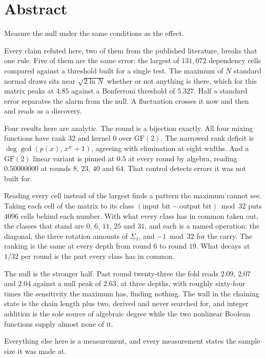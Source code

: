 \chapter*{Abstract}

Measure the null under the same conditions as the effect.

Every claim refuted here, two of them from the published literature, breaks that one rule.
Five of them are the same error: the largest of $131{,}072$ dependency cells compared against a
threshold built for a single test. The maximum of $N$ standard normal draws sits near
$\sqrt{2 \ln N}$ whether or not anything is there, which for this matrix peaks at $4.85$ against a
Bonferroni threshold of $5.327$. Half a standard error separates the alarm from the null.
A fluctuation crosses it now and then and reads as a discovery.

Four results here are analytic. The round is a bijection exactly. All four
mixing functions have rank $32$ and kernel $0$ over $\mathrm{GF}(2)$. The narrowed rank deficit is
$\deg \gcd(p(x),\, x^w + 1)$, agreeing with elimination at eight widths. And a $\mathrm{GF}(2)$
linear variant is pinned at $0.5$ at every round by algebra, reading $0.50000000$ at rounds $8$,
$23$, $40$ and $64$. That control detects errors it was not built for.

Reading every cell instead of the largest finds a pattern the maximum cannot see. Taking each cell
of the matrix to its class $(\text{input bit} - \text{output bit}) \bmod 32$ puts $4096$ cells
behind each number. With what every class has in common taken out, the classes that stand are $0$,
$6$, $11$, $25$ and $31$, and each is a named operation: the diagonal, the three rotation amounts of
$\Sigma_1$, and $-1 \bmod 32$ for the carry. The ranking is the same at every depth from round $6$
to round $19$. What decays at $1/32$ per round is the part every class has in common.

The null is the stronger half. Past round twenty-three the fold reads $2.09$, $2.07$ and $2.04$
against a null peak of $2.63$, at three depths, with roughly sixty-four times the sensitivity the
maximum has, finding nothing. The wall in the chaining state is the chain length plus two, derived
and never searched for, and integer addition is the sole source of algebraic degree while the two
nonlinear Boolean functions supply almost none of it.

Everything else here is a measurement, and every measurement states the sample size it was
made at.
\cleardoublepage
